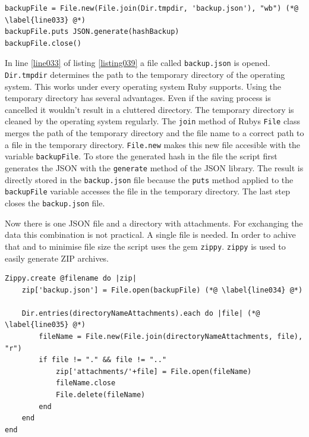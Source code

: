 \begin{lstlisting}[aboveskip=1\baselineskip, caption=Using the temporary directory of the operating system to save the JSON to file., label=listing039]
backupFile = File.new(File.join(Dir.tmpdir, 'backup.json'), "wb") (*@ \label{line033} @*)
backupFile.puts JSON.generate(hashBackup)
backupFile.close()
\end{lstlisting}

In line \ref{line033} of listing \ref{listing039} a file called \texttt{backup.json} is opened. \lstinline{Dir.tmpdir} determines the path to the temporary directory of the operating system. This works under every operating system Ruby supports. Using the temporary directory has several advantages. Even if the saving process is cancelled it wouldn't result in a cluttered directory. The temporary directory is cleaned by the operating system regularly. The \lstinline{join} method of Rubys \lstinline{File} class merges the path of the temporary directory and the file name to a correct path to a file in the temporary directory. \lstinline{File.new} makes this new file accesible with the variable \lstinline{backupFile}. To store the generated hash in the file the script first generates the JSON with the \lstinline{generate} method of the JSON library. The result is directly stored in the \texttt{backup.json} file because the \lstinline{puts} method applied to the \lstinline{backupFile} variable accesses the file in the temporary directory. The last step closes the \texttt{backup.json} file.

Now there is one JSON file and a directory with attachments. For exchanging the data this combination is not practical. A single file is needed. In order to achive that and to minimise file size the script uses the gem \texttt{zippy}. \texttt{zippy} is used to easily generate ZIP archives. 

\begin{lstlisting}[aboveskip=1\baselineskip, caption=Creating a ZIP archive out of the backed up data., label=listing040]
Zippy.create @filename do |zip|
	zip['backup.json'] = File.open(backupFile) (*@ \label{line034} @*)

	Dir.entries(directoryNameAttachments).each do |file| (*@ \label{line035} @*)
		fileName = File.new(File.join(directoryNameAttachments, file), "r") 
		if file != "." && file != ".."
			zip['attachments/'+file] = File.open(fileName)
			fileName.close
			File.delete(fileName)
		end
	end
end
\end{lstlisting}

